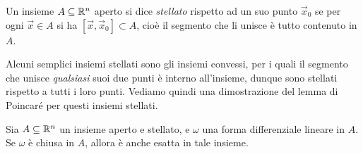 \begin{definizione} \label{d:insieme-stellato}
	Un insieme $A\subseteq\mathbb{R}^n$ aperto si dice \emph{stellato} rispetto ad un suo punto $\vec x_0$ se per ogni $\vec x\in A$ si ha $[\vec x,\vec x_0]\subset A$, cioè il segmento che li unisce è tutto contenuto in $A$.
\end{definizione}
Alcuni semplici insiemi stellati sono gli insiemi convessi, per i quali il segmento che unisce \emph{qualsiasi} suoi due punti è interno all'insieme, dunque sono stellati rispetto a tutti i loro punti.
Vediamo quindi una dimostrazione del lemma di Poincar\'e per questi insiemi stellati.
\begin{teorema} \label{t:poincare-stellato}
	Sia $A\subseteq\mathbb{R}^n$ un insieme aperto e stellato, e $\omega$ una forma differenziale lineare in $A$.
	Se $\omega$ è chiusa in $A$, allora è anche esatta in tale insieme.
\end{teorema}
